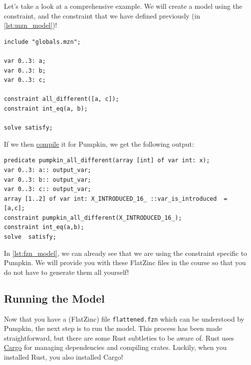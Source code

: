 \documentclass{article}
\begin{document}
        Let's take a look at a comprehensive example.
        We will create a model using the \href{https://docs.minizinc.dev/en/stable/lib-globals-alldifferent.html#all-different}{} constraint, and the \href{https://docs.minizinc.dev/en/stable/lib-flatzinc-int.html#int-eq}{} constraint that we have defined previously (in \autoref{lst:mzn_model})!
         \begin{listing}[H]
            \begin{verbatim}
include "globals.mzn";

var 0..3: a;
var 0..3: b;
var 0..3: c;

constraint all_different([a, c]);
constraint int_eq(a, b);

solve satisfy;
            \end{verbatim}
            \caption{A simple MiniZinc model}
            \label{lst:mzn_model}
        \end{listing}
        \noindent If we then \href{https://docs.minizinc.dev/en/stable/minizinc_ide.html#compiling-a-model}{compile} it for Pumpkin, we get the following output:
        \begin{listing}[H]
            \begin{verbatim}
predicate pumpkin_all_different(array [int] of var int: x);
var 0..3: a:: output_var;
var 0..3: b:: output_var;
var 0..3: c:: output_var;
array [1..2] of var int: X_INTRODUCED_16_ ::var_is_introduced  = [a,c];
constraint pumpkin_all_different(X_INTRODUCED_16_);
constraint int_eq(a,b);
solve  satisfy;
            \end{verbatim}
            \caption{A simple MiniZinc model}
            \label{lst:fzn_model}
        \end{listing}
        \noindent In \autoref{lst:fzn_model}, we can already see that we are using the  constraint specific to Pumpkin.
        We will provide you with these FlatZinc files in the course so that you do not have to generate them all yourself!

    \subsection{Running the Model}
        Now that you have a (FlatZinc) file \texttt{flattened.fzn} which can be understood by Pumpkin, the next step is to run the model.
        This process has been made straightforward, but there are some Rust subtleties to be aware of.
        Rust uses \href{https://doc.rust-lang.org/cargo/}{Cargo} for managing dependencies and compiling crates.
        Luckily, when you installed Rust, you also installed Cargo!
\end{document}
